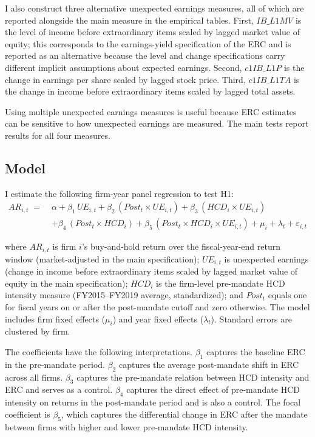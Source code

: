 \documentclass[12pt]{article}
\begin{document}
I also construct three alternative unexpected earnings measures, all of which are reported alongside the main measure in the empirical tables. First, $IB\_L1MV$ is the level of income before extraordinary items scaled by lagged market value of equity; this corresponds to the earnings-yield specification of the ERC and is reported as an alternative because the level and change specifications carry different implicit assumptions about expected earnings. Second, $c1IB\_L1P$ is the change in earnings per share scaled by lagged stock price. Third, $c1IB\_L1TA$ is the change in income before extraordinary items scaled by lagged total assets.

Using multiple unexpected earnings measures is useful because ERC estimates can be sensitive to how unexpected earnings are measured. The main tests report results for all four measures.

\subsection{Model}

I estimate the following firm-year panel regression to test H1:
\begin{equation}
\begin{aligned}
AR_{i,t} \;=\;& \alpha + \beta_1\, UE_{i,t} + \beta_2\, (Post_t \times UE_{i,t}) + \beta_3\, (HCD_i \times UE_{i,t}) \\
&+ \beta_4\, (Post_t \times HCD_i) + \beta_5\, (Post_t \times HCD_i \times UE_{i,t}) + \mu_i + \lambda_t + \varepsilon_{i,t}
\end{aligned}
\label{eq:main}
\end{equation}

\noindent where $AR_{i,t}$ is firm $i$'s buy-and-hold return over the fiscal-year-end return window (market-adjusted in the main specification); $UE_{i,t}$ is unexpected earnings (change in income before extraordinary items scaled by lagged market value of equity in the main specification); $HCD_i$ is the firm-level pre-mandate HCD intensity measure (FY2015--FY2019 average, standardized); and $Post_t$ equals one for fiscal years on or after the post-mandate cutoff and zero otherwise. The model includes firm fixed effects ($\mu_i$) and year fixed effects ($\lambda_t$). Standard errors are clustered by firm.

The coefficients have the following interpretations. $\beta_1$ captures the baseline ERC in the pre-mandate period. $\beta_2$ captures the average post-mandate shift in ERC across all firms. $\beta_3$ captures the pre-mandate relation between HCD intensity and ERC and serves as a control. $\beta_4$ captures the direct effect of pre-mandate HCD intensity on returns in the post-mandate period and is also a control. The focal coefficient is $\beta_5$, which captures the differential change in ERC after the mandate between firms with higher and lower pre-mandate HCD intensity.
\end{document}
